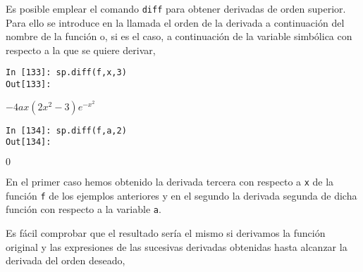 \begin{paracol}{2}
Es posible emplear el comando \texttt{diff} para obtener derivadas de orden superior. Para ello se introduce en la llamada el orden de la derivada a continuación del nombre de la función o, si es el caso, a continuación de la variable simbólica con respecto a la que se quiere derivar,
\end{paracol}
\begin{center}
	\begin{minipage}{.5\textwidth}
		\begin{verbatim}
In [133]: sp.diff(f,x,3)
Out[133]: 

		\end{verbatim}
		$-4ax(2x^2-3)e^{-x^2}$
		\begin{verbatim}
In [134]: sp.diff(f,a,2)
Out[134]: 
		\end{verbatim}
		$0$
	\end{minipage}
\end{center}
\begin{paracol}{2}
En el primer caso hemos obtenido la derivada tercera con respecto a \texttt{x} de la función \texttt{f} de los ejemplos anteriores y en el segundo la derivada segunda de dicha función con respecto a la variable \texttt{a}. 

Es fácil comprobar que el resultado sería el mismo si derivamos la función original y las expresiones de las sucesivas derivadas obtenidas hasta alcanzar la derivada del orden deseado,
\end{paracol}

